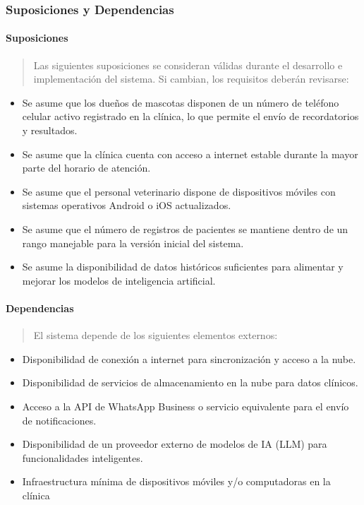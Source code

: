 \documentclass[
]{article}
\begin{document}
\subsubsection{Suposiciones y
Dependencias}\label{suposiciones-y-dependencias}

\paragraph{Suposiciones}\label{suposiciones}

\begin{quote}
Las siguientes suposiciones se consideran válidas durante el desarrollo
e implementación del sistema. Si cambian, los requisitos deberán
revisarse:
\end{quote}

\begin{itemize}
\item
  Se asume que los dueños de mascotas disponen de un número de teléfono
  celular activo registrado en la clínica, lo que permite el envío de
  recordatorios y resultados.
\item
  Se asume que la clínica cuenta con acceso a internet estable durante
  la mayor parte del horario de atención.
\item
  Se asume que el personal veterinario dispone de dispositivos móviles
  con sistemas operativos Android o iOS actualizados.
\item
  Se asume que el número de registros de pacientes se mantiene dentro de
  un rango manejable para la versión inicial del sistema.
\item
  Se asume la disponibilidad de datos históricos suficientes para
  alimentar y mejorar los modelos de inteligencia artificial.
\end{itemize}

\paragraph{Dependencias}\label{dependencias}

\begin{quote}
El sistema depende de los siguientes elementos externos:
\end{quote}

\begin{itemize}
\item
  Disponibilidad de conexión a internet para sincronización y acceso a
  la nube.
\item
  Disponibilidad de servicios de almacenamiento en la nube para datos
  clínicos.
\item
  Acceso a la API de WhatsApp Business o servicio equivalente para el
  envío de notificaciones.
\item
  Disponibilidad de un proveedor externo de modelos de IA (LLM) para
  funcionalidades inteligentes.
\item
  Infraestructura mínima de dispositivos móviles y/o computadoras en la
  clínica
\end{itemize}
\end{document}
